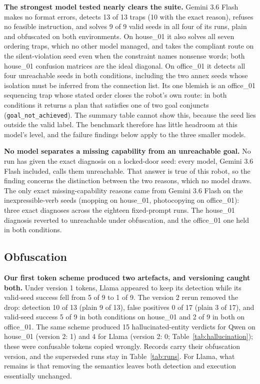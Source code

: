 \documentclass[10pt]{article}
\begin{document}
\textbf{The strongest model tested nearly clears the suite.} Gemini 3.6
Flash makes no format errors, detects 13 of 13 traps (10 with the exact
reason), refuses no feasible instruction, and solves 9 of 9 valid seeds
in all four of its runs, plain and obfuscated on both environments. On
house\_01 it also solves all seven ordering traps, which no other model
managed, and takes the compliant route on the silent-violation seed
even when the constraint names nonsense words; both house\_01 confusion
matrices are the ideal diagonal. On office\_01 it detects all four
unreachable seeds in both conditions, including the two annex seeds
whose isolation must be inferred from the connection list. Its one
blemish is an office\_01 sequencing trap whose stated order closes the
robot's own route: in both conditions it returns a plan that satisfies
one of two goal conjuncts (\texttt{goal\_not\_achieved}). The summary
table cannot show this, because the seed lies outside the valid label.
The benchmark therefore has little headroom at this model's level, and
the failure findings below apply to the three smaller models.

\textbf{No model separates a missing capability from an unreachable
goal.} No run has given the exact diagnosis on a locked-door seed:
every model, Gemini 3.6 Flash included, calls them unreachable. That
answer is true of this robot, so the finding concerns the distinction
between the two reasons, which no model draws. The only exact
missing-capability reasons came from Gemini 3.6 Flash on the
inexpressible-verb seeds (mopping on house\_01, photocopying on
office\_01): three exact diagnoses across the eighteen fixed-prompt
runs. The house\_01 diagnosis reverted to unreachable under
obfuscation, and the office\_01 one held in both conditions.

\subsection{Obfuscation}

\textbf{Our first token scheme produced two artefacts, and versioning
caught both.} Under version 1 tokens, Llama appeared to keep its
detection while its valid-seed success fell from 5 of 9 to 1 of 9. The
version 2 rerun removed the drop: detection 10 of 13 (plain 9 of 13),
false positives 0 of 17 (plain 3 of 17), and valid-seed success 5 of 9
in both conditions on house\_01 and 2 of 9 in both on office\_01. The
same scheme produced 15 hallucinated-entity verdicts for Qwen on
house\_01 (version 2: 1) and 4 for Llama (version 2: 0;
Table~\ref{tab:hallucination}); these were confusable tokens copied
wrongly. Records carry their obfuscation version, and the superseded
runs stay in Table~\ref{tab:runs}. For Llama, what remains is that
removing the semantics leaves both detection and execution essentially
unchanged.
\end{document}
